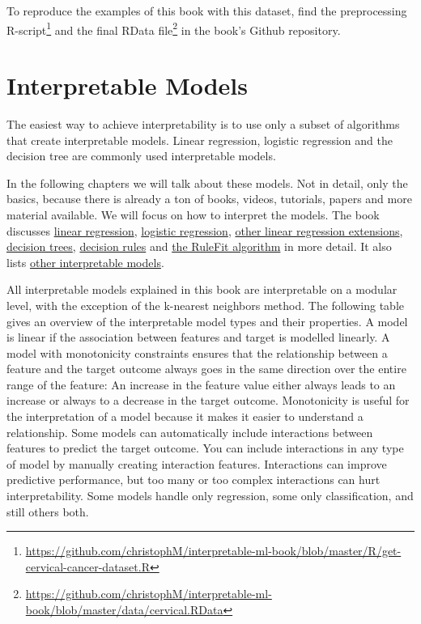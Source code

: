 \documentclass[
  12pt,
]{krantz}
\renewcommand{\href}[2]{#2\footnote{\url{#1}}}
\begin{document}
To reproduce the examples of this book with this dataset, find the
\href{https://github.com/christophM/interpretable-ml-book/blob/master/R/get-cervical-cancer-dataset.R}{preprocessing R-script} and the
\href{https://github.com/christophM/interpretable-ml-book/blob/master/data/cervical.RData}{final RData file} in the book's Github repository.

\hypertarget{simple}{%
\chapter{Interpretable Models}\label{simple}}

The easiest way to achieve interpretability is to use only a subset of algorithms that create interpretable models.
Linear regression, logistic regression and the decision tree are commonly used interpretable models.

In the following chapters we will talk about these models.
Not in detail, only the basics, because there is already a ton of books, videos, tutorials, papers and more material available.
We will focus on how to interpret the models.
The book discusses \protect\hyperlink{limo}{linear regression}, \protect\hyperlink{logistic}{logistic regression}, \protect\hyperlink{extend-lm}{other linear regression extensions}, \protect\hyperlink{tree}{decision trees}, \protect\hyperlink{rules}{decision rules} and \protect\hyperlink{rulefit}{the RuleFit algorithm} in more detail.
It also lists \protect\hyperlink{other-interpretable}{other interpretable models}.

All interpretable models explained in this book are interpretable on a modular level, with the exception of the k-nearest neighbors method.
The following table gives an overview of the interpretable model types and their properties.
A model is linear if the association between features and target is modelled linearly.
A model with monotonicity constraints ensures that the relationship between a feature and the target outcome always goes in the same direction over the entire range of the feature:
An increase in the feature value either always leads to an increase or always to a decrease in the target outcome.
Monotonicity is useful for the interpretation of a model because it makes it easier to understand a relationship.
Some models can automatically include interactions between features to predict the target outcome.
You can include interactions in any type of model by manually creating interaction features.
Interactions can improve predictive performance, but too many or too complex interactions can hurt interpretability.
Some models handle only regression, some only classification, and still others both.
\end{document}
